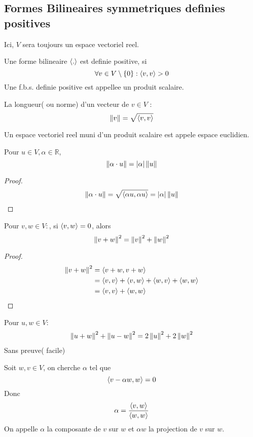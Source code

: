 \documentclass[../main.tex]{subfiles}
\begin{document}
\subsection{Formes Bilineaires symmetriques definies positives}
Ici, $V$ sera toujours un espace vectoriel reel.\\
\begin{defn}
	Une forme bilineaire $\left\langle.\right\rangle$ est definie positive, si
	\[ 
	\forall v \in V\setminus \left\{ 0 \right\} : \left\langle v,v\right\rangle >0
	\]
	Une f.b.s. definie positive est appellee un produit scalaire.
\end{defn}
\begin{defn}
	La longueur( ou norme) d'un vecteur de $v \in V$ :
	\[ 
	\left\lVert v\right\rVert = \sqrt{\left\langle v,v\right\rangle } 
	\]
	
\end{defn}
\begin{defn}
	Un espace vectoriel reel muni d'un produit scalaire est appele espace euclidien.
\end{defn}
\begin{propo}
Pour $u \in V, \alpha \in \mathbb{R}$,
\[ 
\left\lVert \alpha \cdot u\right\rVert = | \alpha| \left\lVert u\right\rVert
\]

\end{propo}
\begin{proof}
\begin{align*}
\left\lVert \alpha \cdot u\right\rVert  = \sqrt{\left\langle \alpha u, \alpha u\right\rangle } = | \alpha| \left\lVert u\right\rVert
\end{align*}
\end{proof}
\begin{thm}
	Pour $v,w \in V:$, si $\left\langle v,w\right\rangle =0$, alors
	\[ 
	\left\lVert v+ w\right\rVert ^{2} = \left\lVert v\right\rVert ^{2} + \left\lVert w\right\rVert ^{2}
	\]
	
\end{thm}
\begin{proof}
\begin{align*}
	\left\lVert v+w\right\rVert ^{2} &= \left\langle v+w, v+w\right\rangle \\
		       &= \left\langle v,v\right\rangle  + \left\langle v,w\right\rangle + \left\langle w,v\right\rangle  + \left\langle w,w\right\rangle \\
		       &= \left\langle v,v\right\rangle  + \left\langle w,w\right\rangle 
\end{align*}

\end{proof}
\begin{propo}
	Pour $u,w \in V:$ 
	\begin{align*}
\left\lVert u+w\right\rVert ^{2} + \left\lVert u-w\right\rVert ^{2} = 2 \left\lVert u\right\rVert ^{2} + 2 \left\lVert w\right\rVert ^{2}	
	\end{align*}
	Sans preuve( facile) 
\end{propo}
Soit $w,v \in V$, on cherche $\alpha$ tel que
\[ 
\left\langle v-\alpha w,w\right\rangle  = 0
\]
Donc
\[ 
\alpha = \frac{\left\langle v,w\right\rangle }{\left\langle w,w\right\rangle }
\]
On appelle $\alpha$ la composante de $v$ sur $w$ et $\alpha w$ la projection de $v$ sur $w$.
\end{document}
